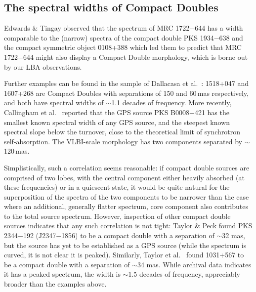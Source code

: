 \documentclass{pasa}%
\begin{document}
\subsection{The spectral widths of Compact Doubles}

Edwards \& Tingay  observed that the spectrum of
MRC 1722$-$644 has a width comparable to the (narrow) spectra of the
compact double PKS 1934$-$638 \cite{tzi02,tzi10} and the compact
symmetric object 0108+388 \cite{ode91,mar01} which led them to predict
that MRC 1722$-$644 might also display a Compact Double morphology,
which is borne out by our LBA observations.

Further examples can be found in the sample of Dallacasa et
al.\ : 1518+047 and 1607+268 are Compact Doubles with
separations of 150 and 60\,mas respectively, and both have spectral
widths of $\sim$1.1 decades of frequency.  More recently, Callingham
et al.\  reported that the GPS source PKS B0008$-$421
has the smallest known spectral width of any GPS source, and the
steepest known spectral slope below the turnover, close to the
theoretical limit of synchrotron self-absorption.  The VLBI-scale
morphology has two components separated by $\sim$120\,mas.

Simplistically, such a correlation seems reasonable: if compact double
sources are comprised of two lobes, with the central component either
heavily absorbed (at these frequencies) or in a quiescent state, it
would be quite natural for the superposition of the spectra of the two
components to be narrower than the case where an additional, generally
flatter spectrum, core component also contributes to the total source
spectrum. However, inspection of other compact double sources
indicates that any such correlation is not tight: Taylor \& Peck
 found PKS 2344$-$192 (J2347$-$1856) to be a compact
double with a separation of $\sim$32 mas, but the source has yet to be
established as a GPS source (while the spectrum is curved, it is not
clear it is peaked).  Similarly, Taylor et al.\ 
found 1031+567 to be a compact double with a separation of $\sim$34
mas. While archival data indicates it has a peaked spectrum, the width
is $\sim$1.5 decades of frequency, appreciably broader than the
examples above.
\end{document}
